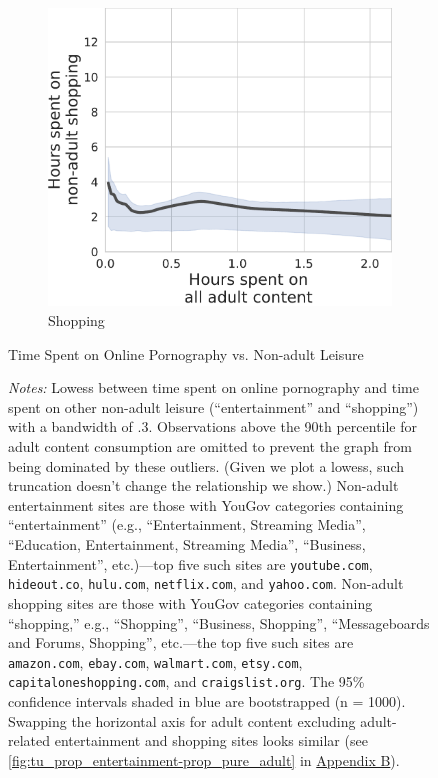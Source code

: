 \documentclass[12pt,twoside]{article}
\begin{document}
\begin{figure}[!ht]
\begin{subfigure}[b]{0.495\textwidth}
         \includegraphics[width=\textwidth]{figs/tu_duration_shop-duration_adult.pdf}
         \caption{Shopping}
     \end{subfigure}
\caption{Time Spent on Online Pornography vs. Non-adult Leisure}
\caption*{\footnotesize \emph{Notes:} Lowess between time spent on online pornography and time spent on other non-adult leisure (``entertainment'' and ``shopping'') with a bandwidth of .3. Observations above the 90th percentile for adult content consumption are omitted to prevent the graph from being dominated by these outliers. (Given we plot a lowess, such truncation doesn't change the relationship we show.) Non-adult entertainment sites are those with YouGov categories containing ``entertainment'' (e.g., ``Entertainment, Streaming Media'', ``Education, Entertainment, Streaming Media'', ``Business, Entertainment'', etc.)---top five such sites are \texttt{youtube.com}, \texttt{hideout.co}, \texttt{hulu.com}, \texttt{netflix.com}, and \texttt{yahoo.com}. Non-adult shopping sites are those with YouGov categories containing ``shopping,'' e.g., ``Shopping'', ``Business, Shopping'', ``Messageboards and Forums, Shopping'', etc.---the top five such sites are \texttt{amazon.com}, \texttt{ebay.com}, \texttt{walmart.com}, \texttt{etsy.com}, \texttt{capitaloneshopping.com}, and \texttt{craigslist.org}. The 95\% confidence intervals shaded in blue are bootstrapped (n = 1000). Swapping the horizontal axis for adult content excluding adult-related entertainment and shopping sites looks similar (see \cref{fig:tu_prop_entertainment-prop_pure_adult} in \hyperref[sm:smB]{Appendix B}). 
}
\end{figure}
\end{document}
